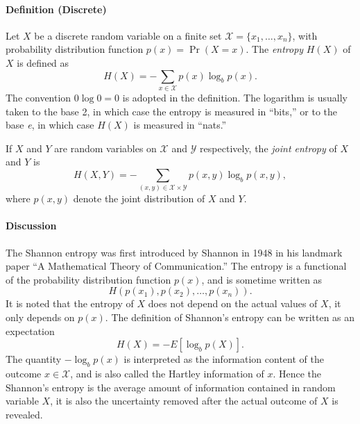 \documentclass[12pt]{article}
\begin{document}



\paragraph{Definition (Discrete)}

Let $X$ be a discrete random variable on a finite set
$\mathcal{X}=\{x_1,\ldots,x_n\}$, with probability distribution
function $p(x) = \Pr(X=x)$. The {\em entropy} $H(X)$ of $X$ is
defined as
\begin{equation}
H(X) = -\sum_{x \in \mathcal{X}} p(x) \log_b p(x).
\end{equation}
The convention $0 \log 0 =0$ is adopted in the definition. The
logarithm is usually taken to the base 2, in which case the
entropy is measured in ``bits,'' or to the base {\em e}, in which case
$H(X)$ is measured in ``nats.''

If $X$ and $Y$ are random variables on $\mathcal{X}$ and
$\mathcal{Y}$ respectively, the {\em joint entropy} of $X$ and $Y$
is
\[
  H(X,Y) = -\sum_{(x,y)\in \mathcal{X}\times \mathcal{Y}} p(x,y)
  \log_b p(x,y),
\]
where $p(x,y)$ denote the joint distribution of $X$ and $Y$.

\paragraph{Discussion}
The Shannon entropy was first introduced by Shannon in 1948 in his
landmark paper ``A Mathematical Theory of Communication.'' The
entropy is a functional of the probability distribution function
$p(x)$, and is sometime written as
\[
 H(p(x_1), p(x_2),\ldots, p(x_n)).
\]
It is noted that the entropy of $X$ does not depend on the actual
values of $X$, it only depends on $p(x)$. The definition of
Shannon's entropy can be written as an expectation
\[
  H(X) = -E[\log_b p(X)].
\]
The quantity $-\log_b p(x)$ is interpreted as the information
content of the outcome $x\in\mathcal{X}$, and is also called the Hartley
information of $x$. Hence the Shannon's entropy is the average
amount of information contained in random variable $X$, it is also
the uncertainty removed after the actual outcome of $X$ is
revealed.
\end{document}
